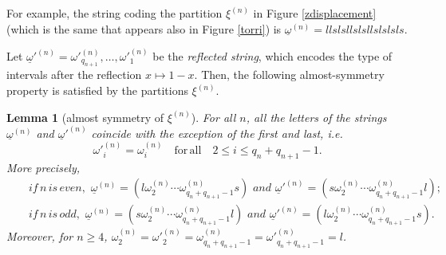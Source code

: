 \documentclass{conm-p-l}
\numberwithin{equation}{section}
\newtheorem{lemma}[theorem]{Lemma}
\begin{document}
For example, the string coding the partition $\xi^{(n)}$ in Figure \ref{zdisplacement} (which is the same that appears also in Figure \ref{torri}) is $\underline{\omega}^{(n)}=llslsllslsllslslsls$.

Let $\underline{\omega}'^{(n)}= \omega'^{(n)}_{q_{n+1}}, \dots, \omega'^{(n)}_1$
be the \emph{reflected string}, which encodes the type of intervals after the
reflection $x\mapsto 1-x$.  Then, the following almost-symmetry property is
satisfied by the partitions $\xi^{(n)}$.
\begin{lemma}[almost symmetry of $\xi^{(n)}$]\label{almostsymmetrylemma}
For all $n$, all the letters of the strings $\underline{\omega}^{(n)}$ and
$\underline{\omega}'^{(n)}$ coincide with the exception of the first and last,
i.e.~
\begin{equation} \label{equalities}
\omega'^{(n)}_{i} = \omega^{(n)}_{i}\quad \mathrm{for\, all }\quad  2\leq i \leq
q_{n}+q_{n+1}-1.
\end{equation}
More precisely, 
\begin{eqnarray}&& \mathit{if}\,  n\,  \mathit{is \, even}, \, \, 
\underline{\omega}^{(n)} = (l \omega^{(n)}_2 \cdots \omega^{(n)}_{q_{n}+q_{n+1}-1}
s)\,\, \mathit{and} \,\,  \underline{\omega}'^{(n)} = (s \omega^{(n)}_2 \cdots
\omega^{(n)}_{q_{n}+q_{n+1}-1} l);
\nonumber \\ && \mathit{if}\,  n\,  \mathit{is \, odd}, \, \,
\underline{\omega}^{(n)} = (s \omega^{(n)}_2 \cdots
\omega^{(n)}_{q_{n}+q_{n+1}-1} l)\, \, \mathit{and}\,\,  \underline{\omega}'^{(n)} = (l \omega^{(n)}_2
\cdots \omega^{(n)}_{q_{n}+q_{n+1}-1} s). \nonumber
\end{eqnarray}
Moreover, for $n\geq 4$, $\omega^{(n)}_{2}={\omega}'^{(n)}_2= \omega^{(n)}_{q_{n}+q_{n+1}-1}= {\omega}'^{(n)}_{q_{n}+q_{n+1}-1}=l$.

\end{lemma}
\end{document}
